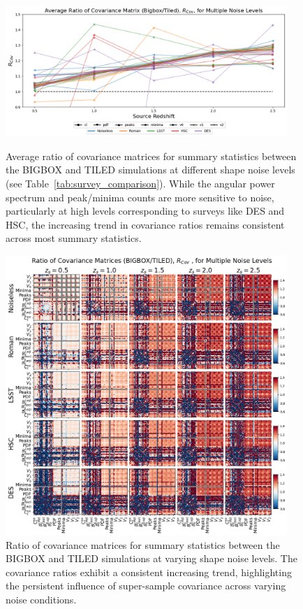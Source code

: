\begin{figure}[p]
    \centering
    \includegraphics[width=0.95\textwidth]{figures/results/avg_cov_ratio_noise.png}
    \caption[Average BIGBOX/TILED Ratio of Covariance for Multiple Noise Levels]
    {Average ratio of covariance matrices for summary statistics between the BIGBOX and TILED simulations at different shape noise levels (see Table~\ref{tab:survey_comparison}). While the angular power spectrum and peak/minima counts are more sensitive to noise, particularly at high levels corresponding to surveys like DES and HSC, the increasing trend in covariance ratios remains consistent across most summary statistics.}
    \label{fig:avg_cov_noise}
    \includegraphics[width=0.95\textwidth]{figures/results/cov_noise.png}
    \caption[BIGBOX/TILED Ratio of Covariance for Multiple Noise Levels]
    {Ratio of covariance matrices for summary statistics between the BIGBOX and TILED simulations at varying shape noise levels. The covariance ratios exhibit a consistent increasing trend, highlighting the persistent influence of super-sample covariance across varying noise conditions.}
    \label{fig:cov_noise}
\end{figure}

